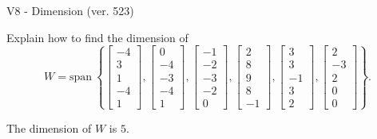 \begin{exercise}
  \begin{exerciseTitle}V8 - Dimension (ver. 523)\end{exerciseTitle}
  \begin{exerciseStatement}
    Explain how to find the dimension of 
\[W=\mathrm{span}\ \left\{\left[\begin{array}{r}
-4 \\
3 \\
1 \\
-4 \\
1
\end{array}\right] , \left[\begin{array}{r}
0 \\
-4 \\
-3 \\
-4 \\
1
\end{array}\right] , \left[\begin{array}{r}
-1 \\
-2 \\
-3 \\
-2 \\
0
\end{array}\right] , \left[\begin{array}{r}
2 \\
8 \\
9 \\
8 \\
-1
\end{array}\right] , \left[\begin{array}{r}
3 \\
3 \\
-1 \\
3 \\
2
\end{array}\right] , \left[\begin{array}{r}
2 \\
-3 \\
2 \\
0 \\
0
\end{array}\right]\right\}.\]



  \end{exerciseStatement}
  \begin{exerciseAnswer}
   The dimension of \(W\) is  \(5\).
  


  \end{exerciseAnswer}
\end{exercise}